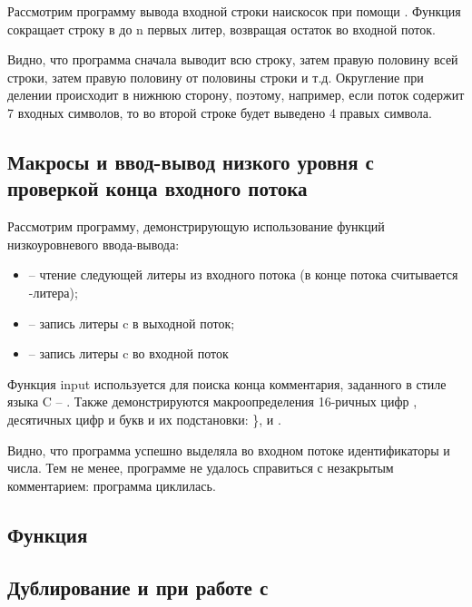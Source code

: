 Рассмотрим программу вывода входной строки наискосок при помощи . Функция  сокращает строку в  до n первых литер, возвращая остаток во входной
поток.



Видно, что программа сначала выводит всю строку, затем правую половину всей строки, затем правую половину от половины строки и т.д. Округление при делении  происходит в нижнюю сторону, поэтому, например, если поток содержит 7 входных символов, то во второй строке будет выведено 4 правых символа.

\subsection{Макросы и ввод-вывод низкого уровня с проверкой конца входного потока}

Рассмотрим программу, демонстрирующую использование функций низкоуровневого ввода-вывода:

\begin{itemize}
	\item {} -- чтение следующей литеры из входного потока (в конце потока считывается -литера);
	\item {} -- запись литеры c в выходной поток;
	\item {} -- запись литеры c во входной поток
\end{itemize}

Функция input используется для поиска конца комментария, заданного в стиле языка C -- \code{/* */}. Также демонстрируются макроопределения 16-ричных цифр , десятичных цифр  и букв  и их подстановки: \},  и .



Видно, что программа успешно выделяла во входном потоке идентификаторы и числа. Тем не менее, программе не удалось справиться с незакрытым комментарием: программа циклилась.

\subsection{Функция }

\subsection{Дублирование  и  при работе с }

